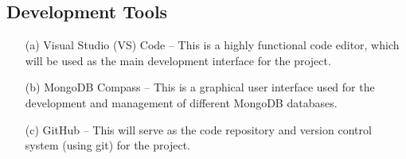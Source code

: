 \subsection{Development Tools}
\label{subsec:dev_tools}
\begin{itemize}
    \item[(a)] Visual Studio (VS) Code – This is a highly functional code editor, 
    which will be used as the main development interface for the project.
    \item[(b)]MongoDB Compass – This is a graphical user interface used for the development 
    and management of different MongoDB databases.
    \item[(c)] GitHub – This will serve as the code repository and 
    version control system (using git) for the project.
\end{itemize}